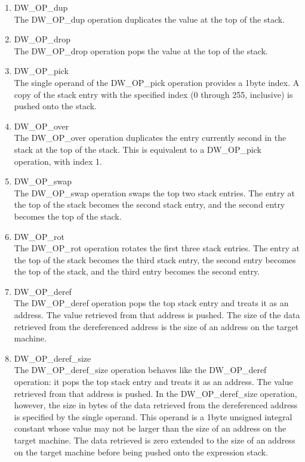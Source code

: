 \begin{enumerate}[1]
\label{chap:DWOPdup}
\item DW\_OP\_dup \\
The DW\_OP\_dup operation duplicates the value at the top of the stack.

\label{chap:DWOPdrop}
\item DW\_OP\_drop \\
The DW\_OP\_drop operation pops the value at the top of the stack.

\label{chap:DWOPpick}
\item DW\_OP\_pick \\
The single operand of the DW\_OP\_pick operation provides a
1\dash byte index. A copy of the stack entry with the specified
index (0 through 255, inclusive) is pushed onto the stack.

\label{chap:DWOPover}
\item DW\_OP\_over \\
The DW\_OP\_over operation duplicates the entry currently second
in the stack at the top of the stack. 
This is equivalent to
a DW\_OP\_pick operation, with index 1.  

\label{chap:DWOPswap}
\item DW\_OP\_swap \\
The DW\_OP\_swap operation swaps the top two stack entries. 
The entry at the top of the
stack becomes the second stack entry, 
and the second entry becomes the top of the stack.

\label{chap:DWOProt}
\item DW\_OP\_rot \\
The DW\_OP\_rot operation rotates the first three stack
entries. The entry at the top of the stack becomes the third
stack entry, the second entry becomes the top of the stack,
and the third entry becomes the second entry.

\label{chap:DWOPderef}
\item  DW\_OP\_deref \\
The DW\_OP\_deref operation pops the top stack entry and 
treats it as an address. The value
retrieved from that address is pushed. 
The size of the data retrieved from the dereferenced
address is the size of an address on the target machine.

\label{chap:DWOPderefsize}
\item DW\_OP\_deref\_size \\
The DW\_OP\_deref\_size operation behaves like the DW\_OP\_deref
operation: it pops the top stack entry and treats it as an
address. The value retrieved from that address is pushed. In
the DW\_OP\_deref\_size operation, however, the size in bytes
of the data retrieved from the dereferenced address is
specified by the single operand. This operand is a 1\dash byte
unsigned integral constant whose value may not be larger
than the size of an address on the target machine. The data
retrieved is zero extended to the size of an address on the
target machine before being pushed onto the expression stack.


\end{enumerate}
